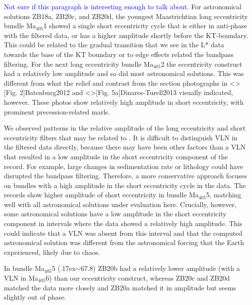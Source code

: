 \documentclass[draft]{agujournal2019}
\newcommand{\appr}{\raise.17ex\hbox{\(\scriptstyle\sim\)}} %
\newcommand{\ma}[1]{Ma\(_{405}\)#1} %
\newcommand{\ijk}{\textcolor{blue}}
\begin{document}
\ijk{Not sure if this paragraph is interesting enough to talk about.}
For astronomical solutions ZB18a, ZB20c, and ZB20d, the youngest Maastrichtian long eccentricity bundle \ma{1} showed a single short eccentricity cycle that is either in anti-phase with the filtered data, or has a higher amplitude shortly before the \gls{KT}-boundary.
This could be related to the gradual transition that we see in the \gls{L*} data towards the base of the \gls{KT} boundary or to edge effects related the bandpass filtering.
For the next long eccentricity bundle \ma{2} the eccentricity construct had a relatively low amplitude and so did most astronomical solutions.
This was different from what the relief and contrast from the section photographs in \citeA<>[Fig. 2]{Batenburg2012} and \citeA<>[Fig. 5a]{Dinares-Turell2013} visually indicated, however.
These photos show relatively high amplitude in short eccentricity, with prominent precession-related marls.

We observed patterns in the relative amplitude of the long eccentricity and short eccentricity filters that may be related to .
It is difficult to distinguish \gls{VLN} in the filtered data directly, because there may have been other factors than a \gls{VLN} that resulted in a low amplitude in the short eccentricity component of the record.
For example, large changes in sedimentation rate or lithology could have disrupted the bandpass filtering.
Therefore, a more conservative approach focuses on bundles with a high amplitude in the short eccentricity cycle in the data.
The records show higher amplitude of short eccentricity in bundle \ma{5}, matching well with all astronomical solutions under evaluation here.
Crucially, however, some astronomical solutions have a low amplitude in the short eccentricity component in intervals where the data showed a relatively high amplitude.
This could indicate that a \gls{VLN} was absent from this interval and that the computed astronomical solution was different from the astronomical forcing that the Earth experienced, likely due to chaos.

In bundle \ma{5} (\appr\qty{67.8}{\millionyearago}) ZB20b had a relatively lower amplitude (with a \gls{VLN} in \ma{6}) than our eccentricity construct, whereas ZB20c and ZB20d matched the data more closely and ZB20a matched it in amplitude but seems slightly out of phase.
\end{document}
